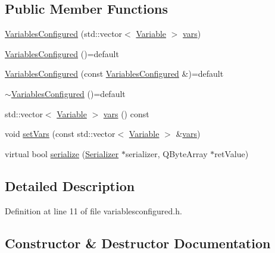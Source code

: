 \subsection*{Public Member Functions}
\begin{DoxyCompactItemize}
\item 
\hyperlink{class_a_h_p_1_1_variables_configured_a254036c73b9d140cdd928907eaeb7604}{Variables\+Configured} (std\+::vector$<$ \hyperlink{class_variable}{Variable} $>$ \hyperlink{class_a_h_p_1_1_variables_configured_a58e19a7e404b2007e12c1557948af405}{vars})
\item 
\hyperlink{class_a_h_p_1_1_variables_configured_aeee73ab87a6cc552d348037eb6912878}{Variables\+Configured} ()=default
\item 
\hyperlink{class_a_h_p_1_1_variables_configured_a7ee585659d23dbf12e9315253b82be04}{Variables\+Configured} (const \hyperlink{class_a_h_p_1_1_variables_configured}{Variables\+Configured} \&)=default
\item 
\hyperlink{class_a_h_p_1_1_variables_configured_abe40af45d50a93640f63afc74a087c2d}{$\sim$\+Variables\+Configured} ()=default
\item 
std\+::vector$<$ \hyperlink{class_variable}{Variable} $>$ \hyperlink{class_a_h_p_1_1_variables_configured_a58e19a7e404b2007e12c1557948af405}{vars} () const 
\item 
void \hyperlink{class_a_h_p_1_1_variables_configured_aabcf02e1aaa833b0509c69815e65e1d2}{set\+Vars} (const std\+::vector$<$ \hyperlink{class_variable}{Variable} $>$ \&\hyperlink{class_a_h_p_1_1_variables_configured_a58e19a7e404b2007e12c1557948af405}{vars})
\item 
virtual bool \hyperlink{class_a_h_p_1_1_variables_configured_aacebf657103b5466334484262883d51e}{serialize} (\hyperlink{class_serializer}{Serializer} $\ast$serializer, Q\+Byte\+Array $\ast$ret\+Value)
\end{DoxyCompactItemize}


\subsection{Detailed Description}


Definition at line 11 of file variablesconfigured.\+h.



\subsection{Constructor \& Destructor Documentation}
\hypertarget{class_a_h_p_1_1_variables_configured_a254036c73b9d140cdd928907eaeb7604}{}
